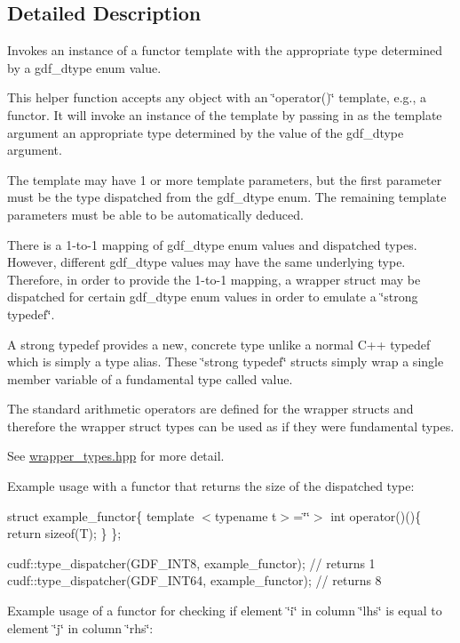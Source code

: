 \subsection{Detailed Description}
Invokes an instance of a functor template with the appropriate type determined by a gdf\+\_\+dtype enum value. 

This helper function accepts any object with an \char`\"{}operator()\char`\"{} template, e.\+g., a functor. It will invoke an instance of the template by passing in as the template argument an appropriate type determined by the value of the gdf\+\_\+dtype argument.

The template may have 1 or more template parameters, but the first parameter must be the type dispatched from the gdf\+\_\+dtype enum. The remaining template parameters must be able to be automatically deduced.

There is a 1-\/to-\/1 mapping of gdf\+\_\+dtype enum values and dispatched types. However, different gdf\+\_\+dtype values may have the same underlying type. Therefore, in order to provide the 1-\/to-\/1 mapping, a wrapper struct may be dispatched for certain gdf\+\_\+dtype enum values in order to emulate a \char`\"{}strong typedef\char`\"{}.

A strong typedef provides a new, concrete type unlike a normal C++ typedef which is simply a type alias. These \char`\"{}strong typedef\char`\"{} structs simply wrap a single member variable of a fundamental type called \textquotesingle{}value\textquotesingle{}.

The standard arithmetic operators are defined for the wrapper structs and therefore the wrapper struct types can be used as if they were fundamental types.

See \hyperlink{wrapper__types_8hpp}{wrapper\+\_\+types.\+hpp} for more detail.

Example usage with a functor that returns the size of the dispatched type\+:

struct example\+\_\+functor\{ template $<$typename t$>$=\char`\"{}\char`\"{}$>$ int operator()()\{ return sizeof(\+T); \} \};

cudf\+::type\+\_\+dispatcher(\+G\+D\+F\+\_\+\+I\+N\+T8, example\+\_\+functor); // returns 1 cudf\+::type\+\_\+dispatcher(\+G\+D\+F\+\_\+\+I\+N\+T64, example\+\_\+functor); // returns 8

Example usage of a functor for checking if element \char`\"{}i\char`\"{} in column \char`\"{}lhs\char`\"{} is equal to element \char`\"{}j\char`\"{} in column \char`\"{}rhs\char`\"{}\+:

